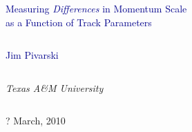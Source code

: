\documentclass[compress]{beamer}
\begin{document}
\begin{frame}
\vfill
\begin{center}
\textcolor{darkblue}{\Large Measuring {\it Differences} in Momentum Scale \\ \vspace{0.2 cm} as a Function of Track Parameters}

\vfill
\begin{columns}
\begin{center}
\large
\textcolor{darkblue}{Jim Pivarski}
\end{center}
\end{columns}

\begin{columns}
\begin{center}
\scriptsize
{\it Texas A\&M University}
\end{center}
\end{columns}

\vfill
 ? March, 2010

\end{center}
\end{frame}


\small
\end{document}
